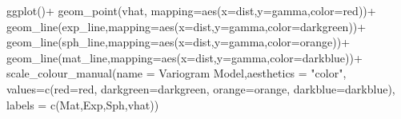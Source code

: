 \documentclass[
  letterpaper,
  DIV=11,
  numbers=noendperiod]{scrartcl}
\newenvironment{Shaded}{\begin{snugshade}}{\end{snugshade}}
\newcommand{\AttributeTok}[1]{\textcolor[rgb]{0.40,0.45,0.13}{#1}}
\newcommand{\FunctionTok}[1]{\textcolor[rgb]{0.28,0.35,0.67}{#1}}
\newcommand{\NormalTok}[1]{\textcolor[rgb]{0.00,0.23,0.31}{#1}}
\newcommand{\OtherTok}[1]{\textcolor[rgb]{0.00,0.23,0.31}{#1}}
\newcommand{\SpecialCharTok}[1]{\textcolor[rgb]{0.37,0.37,0.37}{#1}}
\newcommand{\StringTok}[1]{\textcolor[rgb]{0.13,0.47,0.30}{#1}}
\begin{document}
\begin{Shaded}
\begin{Highlighting}[]
\FunctionTok{ggplot}\NormalTok{()}\SpecialCharTok{+}
  \FunctionTok{geom\_point}\NormalTok{(vhat, }\AttributeTok{mapping=}\FunctionTok{aes}\NormalTok{(}\AttributeTok{x=}\NormalTok{dist,}\AttributeTok{y=}\NormalTok{gamma,}\AttributeTok{color=}\StringTok{\textquotesingle{}red\textquotesingle{}}\NormalTok{))}\SpecialCharTok{+}
  \FunctionTok{geom\_line}\NormalTok{(exp\_line,}\AttributeTok{mapping=}\FunctionTok{aes}\NormalTok{(}\AttributeTok{x=}\NormalTok{dist,}\AttributeTok{y=}\NormalTok{gamma,}\AttributeTok{color=}\StringTok{\textquotesingle{}darkgreen\textquotesingle{}}\NormalTok{))}\SpecialCharTok{+}
  \FunctionTok{geom\_line}\NormalTok{(sph\_line,}\AttributeTok{mapping=}\FunctionTok{aes}\NormalTok{(}\AttributeTok{x=}\NormalTok{dist,}\AttributeTok{y=}\NormalTok{gamma,}\AttributeTok{color=}\StringTok{\textquotesingle{}orange\textquotesingle{}}\NormalTok{))}\SpecialCharTok{+}
  \FunctionTok{geom\_line}\NormalTok{(mat\_line,}\AttributeTok{mapping=}\FunctionTok{aes}\NormalTok{(}\AttributeTok{x=}\NormalTok{dist,}\AttributeTok{y=}\NormalTok{gamma,}\AttributeTok{color=}\StringTok{\textquotesingle{}darkblue\textquotesingle{}}\NormalTok{))}\SpecialCharTok{+}
  \FunctionTok{scale\_colour\_manual}\NormalTok{(}\AttributeTok{name =} \StringTok{\textquotesingle{}Variogram Model\textquotesingle{}}\NormalTok{,}\AttributeTok{aesthetics =} \StringTok{"color"}\NormalTok{,}
                      \AttributeTok{values=}\FunctionTok{c}\NormalTok{(}\StringTok{\textquotesingle{}red\textquotesingle{}}\OtherTok{=}\StringTok{\textquotesingle{}red\textquotesingle{}}\NormalTok{,}
                               \StringTok{\textquotesingle{}darkgreen\textquotesingle{}}\OtherTok{=}\StringTok{\textquotesingle{}darkgreen\textquotesingle{}}\NormalTok{,}
                               \StringTok{\textquotesingle{}orange\textquotesingle{}}\OtherTok{=}\StringTok{\textquotesingle{}orange\textquotesingle{}}\NormalTok{,}
                               \StringTok{\textquotesingle{}darkblue\textquotesingle{}}\OtherTok{=}\StringTok{\textquotesingle{}darkblue\textquotesingle{}}\NormalTok{),}
                      \AttributeTok{labels =} \FunctionTok{c}\NormalTok{(}\StringTok{\textquotesingle{}Mat\textquotesingle{}}\NormalTok{,}\StringTok{\textquotesingle{}Exp\textquotesingle{}}\NormalTok{,}\StringTok{\textquotesingle{}Sph\textquotesingle{}}\NormalTok{,}\StringTok{\textquotesingle{}vhat\textquotesingle{}}\NormalTok{))}
\end{Highlighting}
\end{Shaded}
\end{document}
